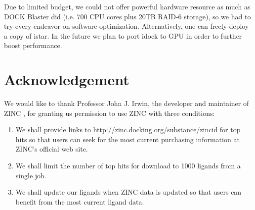 \documentclass{bioinfo}
\begin{document}
Due to limited budget, we could not offer powerful hardware resource as much as DOCK Blaster did (i.e. 700 CPU cores plus 20TB RAID-6 storage), so we had to try every endeavor on software optimization. Alternatively, one can freely deploy a copy of istar. In the future we plan to port idock to GPU in order to further boost performance.

\section*{Acknowledgement}

We would like to thank Professor John J. Irwin, the developer and maintainer of ZINC \citep{532,1178}, for granting us permission to use ZINC with three conditions:
\begin{enumerate}
\item We shall provide links to http://zinc.docking.org/substance/zincid for top hits so that users can seek for the most current purchasing information at ZINC's official web site.
\item We shall limit the number of top hits for download to 1000 ligands from a single job.
\item We shall update our ligands when ZINC data is updated so that users can benefit from the most current ligand data.
\end{enumerate}



\end{document}
